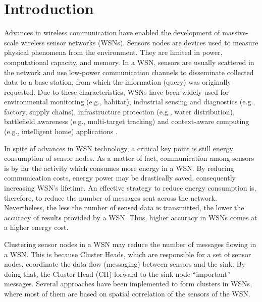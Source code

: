 \documentclass{acm_proc_article-sp}
\begin{document}




\section{Introduction}

Advances in wireless communication have enabled the development of massive-scale
wireless sensor networks (WSNs). Sensors nodes are devices used to measure
physical phenomena from the environment. They are limited in power,
computational capacity, and memory. In a WSN, sensors are usually scattered in
the network and use low-power communication channels to disseminate collected
data to a base station, from which the information (query) was originally
requested. Due to these characteristics, WSNs have been widely used for
environmental monitoring (e.g., habitat), industrial sensing and
diagnostics (e.g., factory, supply chains), infrastructure protection (e.g.,
water distribution), battlefield awareness (e.g., multi-target tracking) and
context-aware computing (e.g., intelligent home) applications
\cite{MaiaACR2013}.
\vspace*{-.3cm}

In spite of advances in WSN technology, a critical key point is still energy
consumption of sensor nodes. As a matter of fact, communication among sensors is
by far the activity which consumes more energy in a WSN. By reducing
communication costs, energy power may be drastically saved, consequently
increasing WSN's lifetime. An effective strategy to reduce energy consumption
is, therefore, to reduce the number of messages sent across the network.
Nevertheless, the less the number of sensed data is transmitted, the lower the
accuracy of results provided by a WSN. Thus, higher accuracy in WSNs comes at a
higher energy cost.
\vspace*{-.3cm}

Clustering sensor nodes in a WSN may reduce the number of messages flowing in a
WSN. This is because Cluster Heads, which are responsible for a set of
sensor nodes, coordinate the data flow (messaging) between sensors and the sink.
By doing that, the Cluster Head (CH) forward to the sink node ``important''
messages. Several approaches have been implemented to form clusters in WSNs,
where most of them are based on spatial correlation of the sensors of the WSN.
\vspace*{-.3cm}
\end{document}

